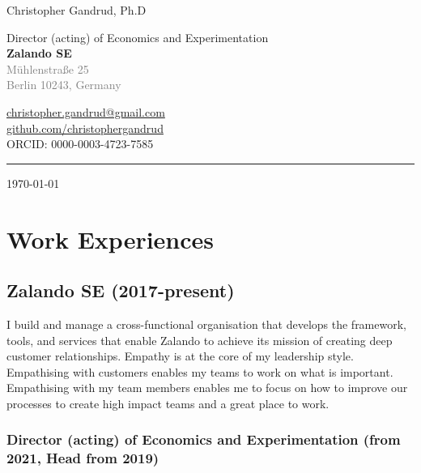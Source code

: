 \documentclass[a4paper]{article}
\begin{document}
    \begin{flushright}
        {\huge{Christopher Gandrud, Ph.D}} \\
        \vspace{0.251cm}

        Director (acting) of Economics and Experimentation \\
        {\bf{\large{Zalando SE}}} \\
        \textcolor{gray}{M\"{u}hlenstra{\ss}e 25\\
        Berlin 10243, Germany} \\
        \vspace{0.25cm}

        \href{mailto:christopher.gandrud@gmail.com}{christopher.gandrud@gmail.com}\\
        \href{https://github.com/christophergandrud}{github.com/christophergandrud}\\[0.25cm]

        ORCID: 0000-0003-4723-7585\\[0.25cm]

        \medskip\hrule height 1pt

        \vspace{0.5cm}

        \today

    \end{flushright}



\vspace{0.5cm}

\section*{Work Experiences}

\subsection*{Zalando SE (2017-present)}

I build and manage a cross-functional organisation that develops the framework, tools, and services that enable Zalando to achieve its mission of creating deep customer relationships. Empathy is at the core of my leadership style. Empathising with customers enables my teams to work on what is important. Empathising with my team members enables me to focus on how to improve our processes to create high impact teams and a great place to work.

\subsubsection*{Director (acting) of Economics and Experimentation (from 2021, Head from 2019)}
\end{document}
